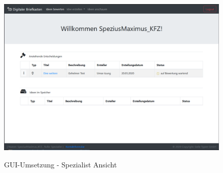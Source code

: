 \begin{figure}[h]
\centering
\begin{minipage}[t]{1\textwidth} 
\caption{GUI-Umsetzung - Spezialist Ansicht } 
\includegraphics[width=1\textwidth]{img/spezialist-umsetzung.png}\\
\end{minipage}
\end{figure}
